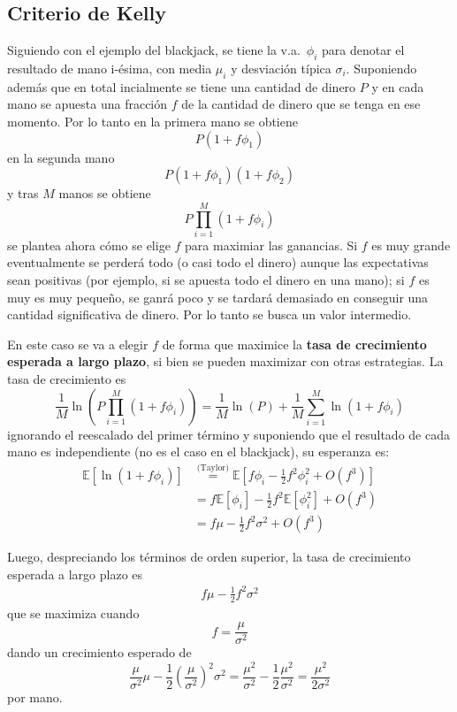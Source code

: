 \subsection{Criterio de Kelly}
Siguiendo con el ejemplo del blackjack, se tiene la v.a.\ $\phi_i$ para denotar el resultado de mano i-ésima, con media $\mu_i$ y desviación típica $\sigma_i$. Suponiendo además que en total incialmente se tiene una cantidad de dinero $P$ y en cada mano se apuesta una fracción $f$ de la cantidad de dinero que se tenga en ese momento. Por lo tanto en la primera mano se obtiene
\[
    P(1+f\phi_1)
\]
en la segunda mano
\[
    P(1+f\phi_1)(1+f\phi_2)
\]
y tras $M$ manos se obtiene
\[
    P\prod_{i=1}^M (1+f\phi_i)
\]
se plantea ahora cómo se elige $f$ para maximiar las ganancias. Si $f$ es muy grande eventualmente se perderá todo (o casi todo el dinero) aunque las expectativas sean positivas (por ejemplo, si se apuesta todo el dinero en una mano); si $f$ es muy es muy pequeño, se ganrá poco y se tardará demasiado en conseguir una cantidad significativa de dinero. Por lo tanto se  busca un valor intermedio.

En este caso se va a elegir $f$ de forma que maximice la \textbf{tasa de crecimiento esperada a largo plazo}, si bien se pueden maximizar con otras estrategias. La tasa de crecimiento es
\[
    \frac{1}{M} \ln\left(  P\prod_{i=1}^M (1+f\phi_i)\right) = \frac{1}{M} \ln(P) + \frac{1}{M} \sum_{i=1}^M \ln(1+f\phi_i)
\]
ignorando el reescalado del primer término y suponiendo que el resultado de cada mano es independiente (no es el caso en el blackjack), su esperanza es:
\begin{align*}
    \mathbb{E}[\ln(1+f\phi_i)] &\overset{\text{(Taylor)}}{=} \mathbb{E}[f\phi_i - \frac{1}{2}f^2\phi_i^2 + O(f^3)] \\
    &= f\mathbb{E}[\phi_i] - \frac{1}{2}f^2\mathbb{E}[\phi_i^2] + O(f^3) \\
    &= f\mu - \frac{1}{2}f^2\sigma^2 + O(f^3)
\end{align*}

Luego, despreciando los términos de orden superior, la tasa de crecimiento esperada a largo plazo es
\begin{align}\label{eq:KellyGrowth}
    f\mu - \frac{1}{2}f^2\sigma^2
\end{align}
que se maximiza cuando
\[
    \boxed{f = \frac{\mu}{\sigma^2}}
\]
dando un crecimiento esperado de
\[
    \frac{\mu}{\sigma^2}\mu - \frac{1}{2}\left(\frac{\mu}{\sigma^2}\right)^2\sigma^2 = \frac{\mu^2}{\sigma^2} - \frac{1}{2}\frac{\mu^2}{\sigma^2} = \boxed{\frac{\mu^2}{2\sigma^2}}
\]
por mano.

